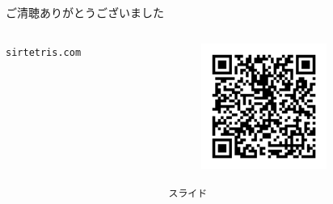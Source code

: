 \documentclass[lualatex,aspectratio=169]{beamer}
\begin{document}
\begin{frame}[t]{ご清聴ありがとうございました}
\begin{columns}
\begin{column}{0.3\textwidth}
\begin{center}
\begin{figure}
        \end{figure}
        \footnotesize\texttt{sirtetris.com}
        \end{center}
    \end{column}
    \begin{column}{0.3\textwidth}
        \begin{center}
        \begin{figure}
        \includegraphics[width=0.7\textwidth]{./img/qr_slides.png}
        \end{figure}
        \footnotesize\texttt{スライド}
        \end{center}
    \end{column}
    \end{columns}
\end{frame}
\end{document}
